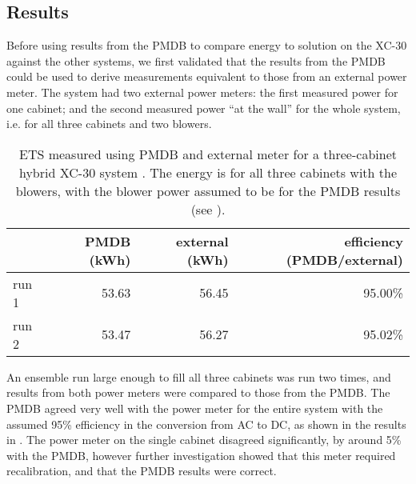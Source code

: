 \subsection{Results}

Before using results from the PMDB to compare energy to solution on the XC-30 against the other systems, we first validated that the results from the PMDB could be used to derive measurements equivalent to those from an external power meter.
The \clogin system had two external power meters: the first measured power for one cabinet; and the second measured power ``at the wall'' for the whole system, i.e. for all three cabinets and two blowers.

\begin{table}[hp!]
\centering
\begin{tabular}{|l|rrr|}
            \cline{2-4}
\multicolumn{1}{c|}{} & PMDB (kWh)& external (kWh)& efficiency (PMDB/external)\\
            \hline
run 1                 & 53.63         & 56.45         & 95.00\%    \\
run 2                 & 53.47         & 56.27         & 95.02\%    \\
            \hline
\end{tabular}
\vspace{5pt}
\caption{ETS measured using PMDB and external meter for a three-cabinet hybrid XC-30 system \clogin. The energy is for all three cabinets with the blowers, with the blower power assumed to be  for the PMDB results (see ).}
\label{tbl:cosmoValidate}
\end{table}

An ensemble run large enough to fill all three cabinets was run two times, and results from both power meters were compared to those from the PMDB.
The PMDB agreed very well with the power meter for the entire system with the assumed 95\% efficiency in the conversion from AC to DC, as shown in the results in .
The power meter on the single cabinet disagreed significantly, by around 5\% with the PMDB, however further investigation showed that this meter required recalibration, and that the PMDB results were correct.

